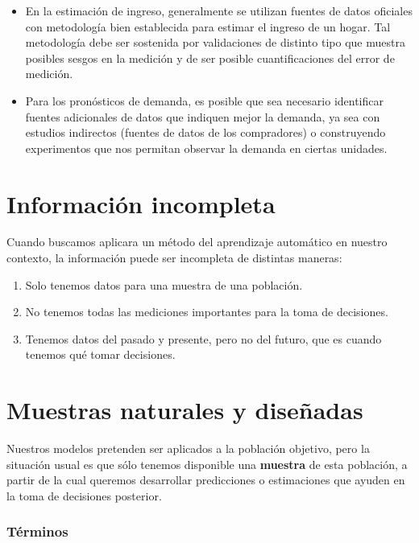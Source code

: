 \documentclass[
]{book}
\providecommand{\tightlist}{%
  \setlength{\itemsep}{0pt}\setlength{\parskip}{0pt}}
\begin{document}
\begin{itemize}
\tightlist
\item
  En la estimación de ingreso, generalmente se utilizan fuentes de datos oficiales con
  metodología bien establecida para estimar el ingreso de un hogar. Tal metodología
  debe ser sostenida por validaciones de distinto tipo que muestra posibles sesgos en la medición y de ser posible cuantificaciones del error de medición.
\item
  Para los pronósticos de demanda, es posible que sea necesario identificar fuentes adicionales
  de datos que indiquen mejor la demanda, ya sea con estudios indirectos (fuentes de datos de los compradores) o
  construyendo experimentos que nos permitan observar la demanda en ciertas unidades.
\end{itemize}

\hypertarget{informaciuxf3n-incompleta}{%
\section{Información incompleta}\label{informaciuxf3n-incompleta}}

Cuando buscamos aplicara un método del aprendizaje automático en nuestro contexto,
la información puede ser incompleta de distintas maneras:

\begin{enumerate}
\def\labelenumi{\arabic{enumi}.}
\tightlist
\item
  Solo tenemos datos para una muestra de una población.
\item
  No tenemos todas las mediciones importantes para la toma de decisiones.
\item
  Tenemos datos del pasado y presente, pero no del futuro, que es cuando
  tenemos qué tomar decisiones.
\end{enumerate}

\hypertarget{muestras-naturales-y-diseuxf1adas}{%
\section{Muestras naturales y diseñadas}\label{muestras-naturales-y-diseuxf1adas}}

Nuestros modelos pretenden ser aplicados a la población objetivo, pero la situación
usual es que sólo tenemos disponible una \textbf{muestra} de esta población, a partir
de la cual queremos desarrollar predicciones o estimaciones que ayuden en la toma
de decisiones posterior.

\hypertarget{tuxe9rminos-1}{%
\subsubsection*{Términos}\label{tuxe9rminos-1}}
\end{document}
